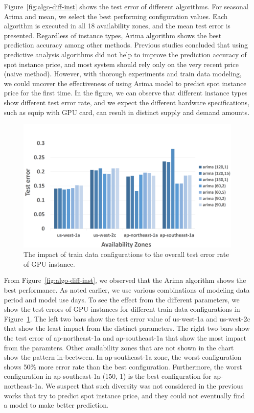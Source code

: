 \documentclass[graybox]{svmult}
\begin{document}
Figure~\ref{fig:algo-diff-inst} shows the test error of different algorithms. For seasonal Arima and mean, we select the best performing configuration values. Each algorithm is executed in all 18 availability zones, and the mean test error is presented. Regardless of instance types, Arima algorithm shows the best prediction accuracy among other methods. Previous studies concluded that using predictive analysis algorithms did not help to improve the prediction accuracy of spot instance price, and most system should rely only on the very recent price (naive method). However, with thorough experiments and train data modeling, we could uncover the effectiveness of using Arima model to predict spot instance price for the first time. In the figure, we can observe that different instance types show different test error rate, and we expect the different hardware specifications, such as equip with GPU card, can result in distinct supply and demand amounts.  
\begin{figure}
\centering\includegraphics[width=1.2\textwidth]{figures/g2-4m-l.png}\caption{The impact of train data configurations to the overall test error rate of GPU instance.\label{fig:g2-param-diverse}}
\end{figure}
From Figure~\ref{fig:algo-diff-inst}, we observed that the Arima algorithm shows the best performance. As noted earlier, we use various combinations of modeling data period and model use days. To see the effect from the different parameters, we show the test errors of GPU instances for different train data configurations in Figure~\ref{fig:g2-param-diverse}. The left two bars show the test error value of us-west-1a and us-west-2c that show the least impact from the distinct parameters. The right two bars show the test error of ap-northeast-1a and ap-southeast-1a that show the most impact from the paramters. Other availability zones that are not shown in the chart show the pattern in-beetween. In ap-southeast-1a zone, the worst configuration shows 50\% more error rate than the best configuration. Furthermore, the worst configuration in ap-southeast-1a (150, 1) is the best configuration for ap-northeast-1a. We suspect that such diversity was not considered in the previous works that try to predict spot instance price, and they could not eventually find a model to make better prediction. 
\end{document}
